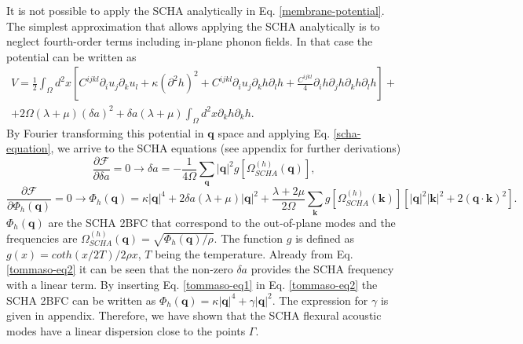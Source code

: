 It is not possible to apply the SCHA analytically in Eq. \ref{membrane-potential}. The simplest approximation that 
allows applying the SCHA analytically is to neglect fourth-order terms including in-plane phonon fields. In that 
case the potential can be written as
\begin{multline}
\label{membrane-potential-tommaso}
V=\frac{1}{2}\int_{\Omega}d^{2}x[C^{ijkl}\partial_{i}u_{j}\partial_{k}u_{l}+\kappa(\partial^{2}h)^{2}+
C^{ijkl}\partial_{i}u_{j}\partial_{k}h\partial_{l}h+\frac{C^{ijkl}}{4}\partial_{i}h\partial_{j}h\partial_{k}h\partial_{l}h]+\\+2\Omega(\lambda+\mu)(\delta a)^{2}+\delta a(\lambda+\mu)\int_{\Omega}d^{2}x\partial_{k}h\partial_{k}h.
\end{multline}
By Fourier transforming this potential in $\boldsymbol{q}$ space and applying Eq. \ref{scha-equation}, we arrive to 
the SCHA equations (see appendix for further derivations)
\begin{equation}
\label{tommaso-eq1}
\frac{\partial\mathcal{F}}{\partial\delta a}=0\rightarrow\delta a=-\frac{1}{4\Omega}\sum_{\boldsymbol{q}}|\boldsymbol{q}|^{2}g[\Omega_{SCHA}^{(h)}(\boldsymbol{q})],
\end{equation}   
\begin{equation}
\label{tommaso-eq2}
\frac{\partial\mathcal{F}}{\partial\Phi_{h}(\boldsymbol{q})}=0\rightarrow\Phi_{h}(\boldsymbol{q})=\kappa|\boldsymbol{q}|^{4}+2\delta a(\lambda+\mu)|\boldsymbol{q}|^{2}+\frac{\lambda+2\mu}{2\Omega}\sum_{\boldsymbol{k}}g[\Omega_{SCHA}^{(h)}(\boldsymbol{k})][|\boldsymbol{q}|^{2}|\boldsymbol{k}|^{2}+2(\boldsymbol{q}\cdot\boldsymbol{k})^{2}].
\end{equation}
$\Phi_{h}(\boldsymbol{q})$ are the SCHA 2BFC that correspond to the out-of-plane modes and the frequencies are 
$\Omega_{SCHA}^{(h)}(\boldsymbol{q})=\sqrt{\Phi_{h}(\boldsymbol{q})/\rho}$. The function $g$ is defined as
$g(x)=coth(x/2T)/2\rho x$, $T$ being the temperature. Already from Eq. \ref{tommaso-eq2} it can be seen that the 
non-zero $\delta a$ provides the SCHA frequency with a linear term. By inserting Eq. \ref{tommaso-eq1} in 
Eq. \ref{tommaso-eq2} the SCHA 2BFC can be written as 
$\Phi_{h}(\boldsymbol{q})=\kappa|\boldsymbol{q}|^{4}+\gamma|\boldsymbol{q}|^{2}$. The expression for $\gamma$ is given in appendix. Therefore, we have shown that the SCHA flexural acoustic modes have a linear dispersion close to the points $\Gamma$. \\


